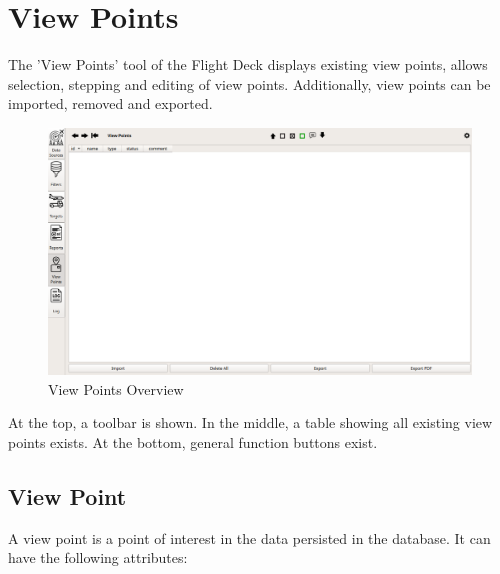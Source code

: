 \section{View Points}
\label{sec:view_points} 

The 'View Points' tool of the Flight Deck displays existing view points, allows selection, stepping and editing of view points. 
Additionally, view points can be imported, removed and exported.

\begin{figure}[H]
    \hspace*{-2.5cm}
    \includegraphics[width=19cm,frame]{figures/view_points.png}
  \caption{View Points Overview}
\end{figure}

At the top, a toolbar is shown. In the middle, a table showing all existing view points exists. At the bottom, general function buttons exist. \\

\subsection{View Point}

A view point is a point of interest in the data persisted in the database. It can have the following attributes:

